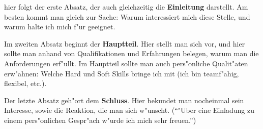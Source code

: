 \documentclass[11pt,german]{g-brief}
\begin{document}
\begin{g-brief}
hier folgt der erste Absatz, der auch gleichzeitig die
\textbf{Einleitung} darstellt. Am besten kommt man gleich zur
Sache: Warum interessiert mich diese Stelle, und warum halte
ich mich f"ur geeignet.
 
Im zweiten Absatz beginnt der \textbf{ Hauptteil}. Hier stellt
man sich vor, und hier sollte man anhand von Qualifikationen
und Erfahrungen belegen, warum man die Anforderungen
erf"ullt. Im Hauptteil sollte man auch pers"onliche Qualit"aten
erw"ahnen: Welche Hard und Soft Skills bringe ich mit (ich bin
teamf"ahig, flexibel, etc.).
 
Der letzte Absatz geh"ort dem \textbf{Schluss}. Hier bekundet
man nocheinmal sein Interesse, sowie die Reaktion, die man sich
w"unscht. ("`"Uber eine Einladung zu einem pers"onlichen
Gespr"ach w"urde ich mich sehr freuen."')
\end{g-brief}
\end{document}

